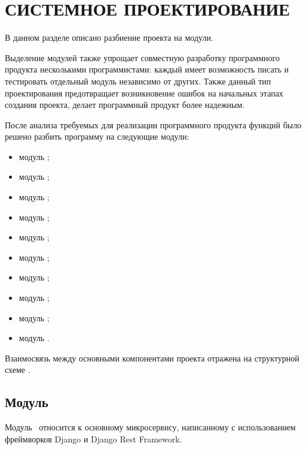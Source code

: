 \section{СИСТЕМНОЕ ПРОЕКТИРОВАНИЕ}
\label{sec:sys}


В данном разделе описано разбиение проекта на модули.

Выделение модулей также упрощает совместную разработку программного продукта несколькими программистами: каждый имеет возможность писать и тестировать отдельный модуль независимо от других.
Также данный тип проектирования предотвращает возникновение ошибок на начальных этапах создания проекта, делает программный продукт более надежным.

После анализа требуемых для реализации программного продукта функций было решено разбить программу на следующие модули:

\begin{itemize}
    \item модуль \moduleAuth;
    \item модуль \moduleStripe;
    \item модуль \moduleTrading;
    \item модуль \moduleAutoTrading;
    \item модуль \moduleNotifications;
    \item модуль \moduleCommunicationPostgres;
    \item модуль \moduleCommunication;
    \item модуль \moduleParsing;
    \item модуль \moduleStatistics;
    \item модуль \moduleCommunicationMongoDB.
\end{itemize}

Взаимосвязь между основными компонентами проекта отражена на структурной схеме
\structScheme.

\subsection{Модуль \moduleAuth}\label{subsec:sys:module-auth}
Модуль \moduleAuth ~относится к основному микросервису, написанному с использованием фреймворков Django и Django Rest Framework.

